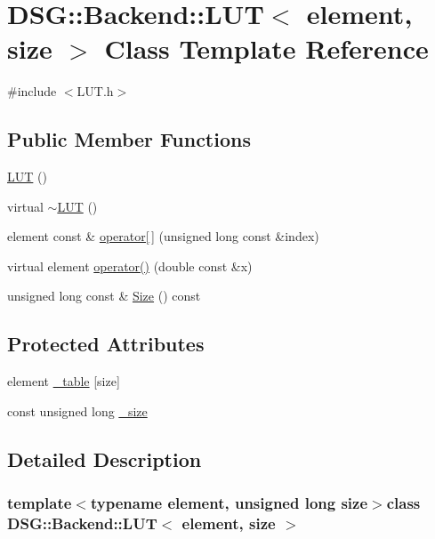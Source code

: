 \hypertarget{classDSG_1_1Backend_1_1LUT}{\section{D\+S\+G\+:\+:Backend\+:\+:L\+U\+T$<$ element, size $>$ Class Template Reference}
\label{classDSG_1_1Backend_1_1LUT}
}


{\ttfamily \#include $<$L\+U\+T.\+h$>$}

\subsection*{Public Member Functions}
\begin{DoxyCompactItemize}
\item 
\hyperlink{classDSG_1_1Backend_1_1LUT_af1a9dbe842f12dbd64dd90553bb8da5a}{L\+U\+T} ()
\item 
virtual \hyperlink{classDSG_1_1Backend_1_1LUT_ad38fd365aacce7f082c68a9f9d84eeac}{$\sim$\+L\+U\+T} ()
\item 
element const \& \hyperlink{classDSG_1_1Backend_1_1LUT_a50d8304c33760ed566039ebf5657807c}{operator\mbox{[}$\,$\mbox{]}} (unsigned long const \&index)
\item 
virtual element \hyperlink{classDSG_1_1Backend_1_1LUT_aef937689f5204ad06ae7732a74b7ec22}{operator()} (double const \&x)
\item 
unsigned long const \& \hyperlink{classDSG_1_1Backend_1_1LUT_a988c07b5002e0aee6e490244b80c8830}{Size} () const 
\end{DoxyCompactItemize}
\subsection*{Protected Attributes}
\begin{DoxyCompactItemize}
\item 
element \hyperlink{classDSG_1_1Backend_1_1LUT_a23615428e84d6be4424c8b897866f253}{\+\_\+table} \mbox{[}size\mbox{]}
\item 
const unsigned long \hyperlink{classDSG_1_1Backend_1_1LUT_ae18fa23936c51c1bdbd21311c9f1054e}{\+\_\+size}
\end{DoxyCompactItemize}


\subsection{Detailed Description}
\subsubsection*{template$<$typename element, unsigned long size$>$class D\+S\+G\+::\+Backend\+::\+L\+U\+T$<$ element, size $>$}



